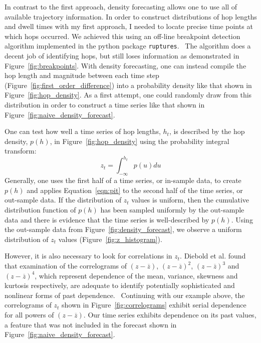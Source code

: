 \documentclass{article}
\begin{document}
  In contrast to the first approach, density forecasting allows one to use
  all of available trajectory information. In order to construct distributions
  of hop lengths and dwell times with my first approach, I needed to 
  locate precise time points at which hops occurred. We achieved this using 
  an off-line breakpoint detection algorithm implemented in the python package 
  \texttt{ruptures}.~\cite{truong_review_2018} The algorithm does a decent
  job of identifying hops, but still loses information as demonstrated in
  Figure~\ref{fig:breakpoints}. With density forecasting, one can instead 
  compile the hop length and magnitude between each time step 
  (Figure~\ref{fig:first_order_difference}) into a probability density
  like that shown in Figure~\ref{fig:hop_density}. As a first attempt, 
  one could randomly draw from this distribution in order to construct
  a time series like that shown in Figure~\ref{fig:naive_density_forecast}.
  
  One can test how well a time series of hop lengths, $h_t$, is described by the 
  hop density, $p(h)$, in Figure~\ref{fig:hop_density} using the probability
  integral transform:~\cite{diebold_evaluating_1998}
  \begin{equation}
  z_t = \int_{-\infty}^{h_t} p(u) du
  \label{eqn:pit}
  \end{equation}
  Generally, one uses the first half of a time series, or in-sample data, to
  create $p(h)$ and applies Equation~\ref{eqn:pit} to the second half of
  the time series, or out-sample data. If the distribution of $z_t$ values
  is uniform, then the cumulative distribution function of $p(h)$ has been
  sampled uniformly by the out-sample data and there is evidence that the 
  time series is well-described by $p(h)$. Using the out-sample data from 
  Figure~\ref{fig:density_forecast}, we observe a uniform distribution of
  $z_t$ values (Figure~\ref{fig:z_histogram}).
  
  However, it is also necessary to look for correlations in $z_t$. Diebold
  et al. found that examination of the correlograms of $(z - \overline{z})$,
  $(z - \overline{z})^2$, $(z - \overline{z})^3$ and $(z - \overline{z})^4$,
  which represent dependence of the mean, variance, skewness and kurtosis 
  respectively, are adequate to identify potentially sophisticated and 
  nonlinear forms of past dependence.~\cite{diebold_evaluating_1998} Continuing
  with our example above, the correlograms of $z_t$ shown in Figure~\ref{fig:correlograms} 
  exhibit serial dependence for all powers of $(z - \overline{z})$. Our 
  time series exhibits dependence on its past values, a feature that was 
  not included in the forecast shown in Figure~\ref{fig:naive_density_forecast}.
  
\end{document}
